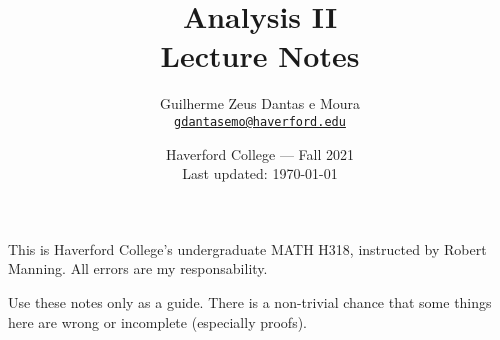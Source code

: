 \documentclass{scrbook}
\title{Analysis II\\Lecture Notes}
\author{Guilherme Zeus Dantas e Moura\\\href{mailto:gdantasemo@haverford.edu}{\texttt{gdantasemo@haverford.edu}}}
\date{Haverford College --- Fall 2021\\Last updated: \today}
\begin{document}
	\maketitle

		This is Haverford College's undergraduate MATH H318, instructed by Robert Manning.
		All errors are my responsability.

		Use these notes only as a guide. There is a non-trivial chance that some things here are wrong or incomplete (especially proofs).

		\tableofcontents
		\newpage

	
	
	
	
	
	
	
	
	
	
	
	
	
	
	
\end{document}

